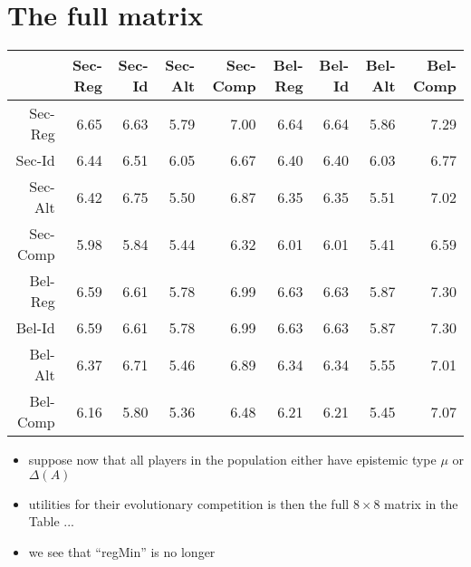 \documentclass[fleqn,reqno,10pt]{article}
\begin{document}
\section{The full matrix}

\begin{table}
  \centering
\begin{tabular}{rrrrrrrrr}
  \hline
 & Sec-Reg & Sec-Id & Sec-Alt & Sec-Comp & Bel-Reg & Bel-Id & Bel-Alt & Bel-Comp \\ 
  \hline
Sec-Reg & 6.65 & 6.63 & 5.79 & 7.00 & 6.64 & 6.64 & 5.86 & 7.29 \\ 
  Sec-Id & 6.44 & 6.51 & 6.05 & 6.67 & 6.40 & 6.40 & 6.03 & 6.77 \\ 
  Sec-Alt & 6.42 & 6.75 & 5.50 & 6.87 & 6.35 & 6.35 & 5.51 & 7.02 \\ 
  Sec-Comp & 5.98 & 5.84 & 5.44 & 6.32 & 6.01 & 6.01 & 5.41 & 6.59 \\ 
  Bel-Reg & 6.59 & 6.61 & 5.78 & 6.99 & 6.63 & 6.63 & 5.87 & 7.30 \\ 
  Bel-Id & 6.59 & 6.61 & 5.78 & 6.99 & 6.63 & 6.63 & 5.87 & 7.30 \\ 
  Bel-Alt & 6.37 & 6.71 & 5.46 & 6.89 & 6.34 & 6.34 & 5.55 & 7.01 \\ 
  Bel-Comp & 6.16 & 5.80 & 5.36 & 6.48 & 6.21 & 6.21 & 5.45 & 7.07 \\ 
   \hline
\end{tabular}\end{table}

\begin{itemize}
\item suppose now that all players in the population either have
  epistemic type $\mu$ or $\Delta(A)$
\item utilities for their evolutionary competition is then the full $8
  \times 8$ matrix in the Table ...
\item we see that ``regMin'' is no longer 
\end{itemize}
\end{document}
